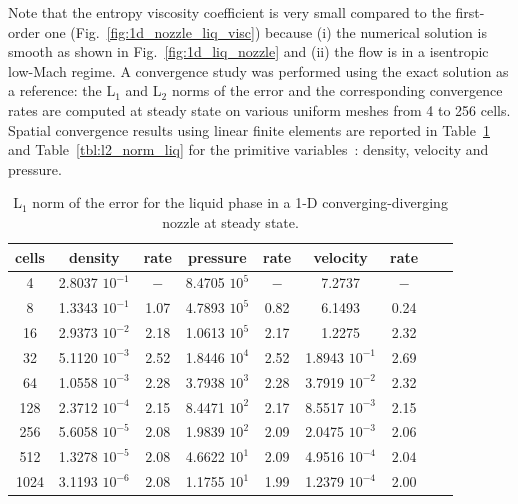 \documentclass[review,10pt]{elsarticle}
\newcommand{\fig}[1]{Fig.~\ref{#1}}                      %
\newcommand{\tbl}[1]{Table~\ref{#1}}                     %
\begin{document}
%
Note that the entropy viscosity coefficient is very small compared to the first-order one (\fig{fig:1d_nozzle_liq_visc}) because 
(i) the numerical solution is smooth as shown in \fig{fig:1d_liq_nozzle} and (ii) the flow is in a isentropic low-Mach regime. 
A convergence study was performed using the exact solution as a reference: the L$_1$ and L$_2$ norms of the 
error and the corresponding convergence rates are computed at steady state on various uniform meshes from 4 to 256 cells.
Spatial convergence results using linear finite elements are reported in \tbl{tbl:l1_norm_liq} and \tbl{tbl:l2_norm_liq} 
for the primitive variables~: density, velocity and pressure.
%
\begin{table}[H]
\begin{center}
 \caption{\label{tbl:l1_norm_liq} L$_1$ norm of the error for the liquid phase in a 1-D converging-diverging nozzle at steady state.}
 \begin{tabular}{|c|c|c|c|c|c|c|c|c|}
 \hline
cells & density         & rate   & pressure        & rate    & velocity         & rate     \\ \hline
4    & 2.8037 $10^{-1}$ & $-$    & 8.4705 $10^{5}$ & $-$     & 7.2737           & $-$      \\ \hline
8    & 1.3343 $10^{-1}$ & 1.07 & 4.7893 $10^{5}$ & 0.82 & 6.1493           & 0.24 \\ \hline
16   & 2.9373 $10^{-2}$ & 2.18 & 1.0613 $10^{5}$ & 2.17  & 1.2275           & 2.32   \\ \hline
32   & 5.1120 $10^{-3}$ & 2.52 & 1.8446 $10^{4}$ & 2.52  & 1.8943 $10^{-1}$ & 2.69   \\ \hline
64   & 1.0558 $10^{-3}$ & 2.28 & 3.7938 $10^{3}$ & 2.28  & 3.7919 $10^{-2}$ & 2.32   \\ \hline
128  & 2.3712 $10^{-4}$ & 2.15 & 8.4471 $10^{2}$ & 2.17  & 8.5517 $10^{-3}$ & 2.15   \\ \hline
256  & 5.6058 $10^{-5}$ & 2.08 & 1.9839 $10^{2}$ & 2.09  & 2.0475 $10^{-3}$ & 2.06   \\ \hline
512  & 1.3278 $10^{-5}$ & $2.08$ & 4.6622 $10^{1}$ & 2.09  & 4.9516 $10^{-4}$ & $2.04$   \\ \hline
1024  & 3.1193 $10^{-6}$ & $2.08$ & 1.1755 $10^{1}$ & 1.99  & 1.2379 $10^{-4}$ & 2.00   \\ \hline
\end{tabular}
\end{center}
\end{table}
%
%
\end{document}
